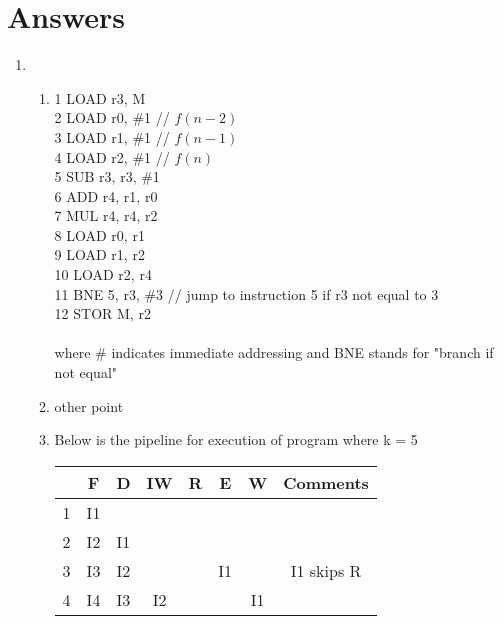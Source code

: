 \documentclass[12pt]{article}
\begin{document}
    \section*{Answers}
    \begin{enumerate}
        \item 
        \begin{enumerate}
            \item 1 LOAD r3, M\\
            2 LOAD r0, \#1  \hspace{1cm}// $f(n - 2)$\\
            3 LOAD r1, \#1 \hspace{1cm} // $f(n-1)$\\
            4 LOAD r2, \#1 \hspace{1cm} // $f(n)$\\
            5 SUB r3, r3, \#1\\
            6 ADD r4, r1, r0\\
            7 MUL r4, r4, r2\\
            8 LOAD r0, r1\\
            9 LOAD r1, r2\\
            10 LOAD r2, r4\\
            11 BNE 5, r3, \#3 \hspace{1cm} // jump to instruction 5 if r3 not equal to 3\\
            12 STOR M, r2\\
            \\
            where \# indicates immediate addressing and BNE stands for "branch if not equal"
            \\
            \item other point
            \clearpage
            \item Below is the pipeline for execution of program where k = 5
            \begin{table}[h!]
            \centering
            \begin{tabular}{||c||c|c|c|c|c|c|c||} 
             \hline
              & F & D & IW & R & E & W & Comments\\ [0.5ex] 
             \hline\hline
             1 & I1 & & & & & & \\ 
             2 & I2 & I1 & & & & &  \\
             3 & I3 & I2 & & & I1 & & I1 skips R\\
             4 & I4 & I3 & I2 & & & I1 & \\

\end{tabular}
\end{table}
\end{enumerate}
\end{enumerate}
\end{document}
